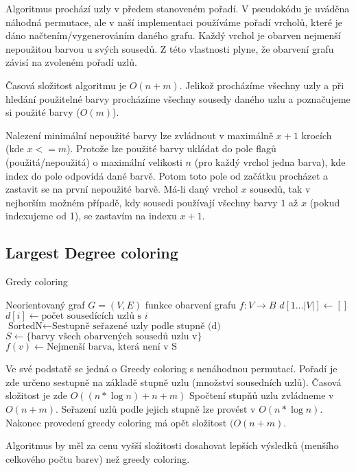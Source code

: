 \documentclass[12pt, a4paper]{article}
\begin{document}
Algoritmus prochází uzly v předem stanoveném pořadí.
V pseudokódu je uváděna náhodná permutace, ale v naší implementaci používáme pořadí vrcholů, které je dáno načtením/vygenerováním daného grafu.
Každý vrchol je obarven nejmenší nepoužitou barvou u svých sousedů.
Z této vlastnosti plyne, že obarvení grafu závisí na zvoleném pořadí uzlů.

Časová složitost algoritmu je $O(n+m)$.
Jelikož procházíme všechny uzly a při hledání použitelné barvy procházíme všechny sousedy daného uzlu a poznačujeme si použité barvy ($O(m)$).

Nalezení minimální nepoužité barvy lze zvládnout v maximálně $x+1$ krocích (kde $x <= m$).
Protože lze použité barvy ukládat do pole flagů (použitá/nepoužitá) o maximální velikosti $n$ (pro každý vrchol jedna barva),
kde index do pole odpovídá dané barvě.
Potom toto pole od začátku procházet a zastavit se na první nepoužité barvě.
Má-li daný vrchol $x$ sousedů, tak v nejhorším možném případě, kdy sousedi používají všechny barvy $1$ až $x$ (pokud indexujeme od 1),
se zastavím na indexu $x+1$.

\subsection{Largest Degree coloring}
\begin{algorithm}
\caption{Gredy coloring} %
\label{Greedy coloring}
\begin{algorithmic}
\Input Neorientovaný graf $G = (V, E)$
\Output funkce obarvení grafu $f: 	V \rightarrow B$
\State $d[1 \dots |V|] \leftarrow []$
	\State $d[i] \leftarrow \text{počet sousedících uzlů s }i$
\EndFor
\State $\text{SortedN} \leftarrow \text{Sestupně seřazené uzly podle stupně (d)}$
	\State $S \leftarrow \{ \text{barvy všech obarvených sousedů uzlu v} \}$
	\State $f(v) \leftarrow \text{Nejmenší barva, která není v S}$ 
\EndFor
\end{algorithmic}
\end{algorithm}

Ve své podstatě se jedná o Greedy coloring s nenáhodnou permutací.
Pořadí je zde určeno sestupně na základě stupně uzlu (množství sousedních uzlů).
Časová složitost je zde $O((n* \log n) + n + m)$
Spočtení stupňů uzlu zvládneme v $O(n+m)$.
Seřazení uzlů podle jejich stupně lze provést v $O(n * \log n)$.
Nakonec provedení greedy coloring má opět složitost $(O(n + m)$. 

Algoritmus by měl za cenu vyšší složitosti dosahovat lepších výsledků (menšího celkového počtu barev) než greedy coloring.
\end{document}

